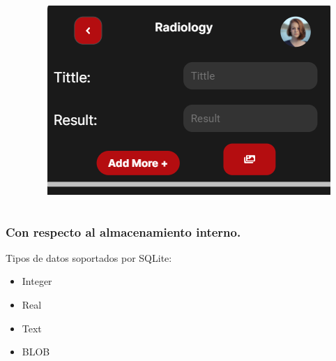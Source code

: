 \documentclass[14pt]{beamer}
\begin{document}
\begin{frame}
\begin{columns}
\begin{column}{0.5\textwidth}
\begin{center}
\end{center}
\end{column}
\begin{column}{0.5\textwidth}
\begin{center}

\includegraphics[scale = 0.55]{Images/photoExampleZoom.png}

\end{center}
\end{column}
\end{columns}

\end{frame}


\begin{frame}
\frametitle{Con respecto al almacenamiento interno.}
Tipos de datos soportados por SQLite:
\begin{itemize}
\item Integer
\item Real
\item Text
\item BLOB
\end{itemize}

\end{frame}
\end{document}
